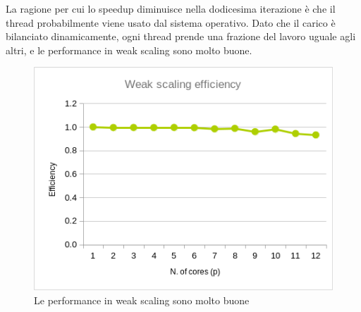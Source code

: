 \documentclass[a4paper,11pt, twoside]{report}
\begin{document}
La ragione per cui lo speedup diminuisce nella dodicesima iterazione è che il thread probabilmente viene usato dal sistema operativo.
Dato che il carico è bilanciato dinamicamente, ogni thread prende una frazione del lavoro uguale agli altri, 
e le performance in weak scaling sono molto buone.
\begin{figure}
    \includegraphics[scale=0.5]{images/omp_weak.png}
    \caption[]{Le performance in weak scaling sono molto buone}
\end{figure}
\end{document}
